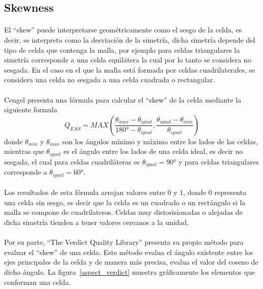 \documentclass[letterpaper, openright, 12pt]{book}
\begin{document}
    \subsection{Skewness}
    \paragraph*{}
    El ``skew'' puede interpretarse geométricamente como el sesgo de la celda,
    es decir, se interpreta como la desviación de la simetría, dicha simetría
    depende del tipo de celda que contenga la malla, por ejemplo para celdas
    triangulares la simetría corresponde a una celda equilátera la cual por lo
    tanto se considera no sesgada. En el caso en el que la malla está formada
    por celdas cuadrilaterales, se considera una celda no sesgada a una celda
    cuadrada o rectangular.

    \paragraph*{}
    Cengel \cite{cengel} presenta una fórmula para calcular el ``skew'' de la
    celda mediante la siguiente formula
    \begin{equation}
      Q_{EAS} = MAX \left(
      \frac{\theta_{max} - \theta_{igual}}{180\si{\degree} - \theta_{igual}},
      \frac{\theta_{igual} - \theta_{min}}{\theta_{igual}}
      \right)
    \end{equation}
    donde $\theta_{min}$ y $\theta_{max}$ son los ángulos mínimo y máximo entre
    los lados de las celdas, mientras que $\theta_{igual}$ es el ángulo entre
    los lados de una celda ideal, es decir no sesgada, el cual para celdas
    cuadriláteras es $\theta_{igual} = 90\si{\degree}$ y para celdas
    triangulares corresponde a $\theta_{igual} = 60\si{\degree}$.

    \paragraph*{}
    Los resultados de esta fórmula arrojan valores entre $0$ y $1$, donde $0$
    representa una celda sin sesgo, es decir que la celda es un cuadrado o un
    rectángulo si la malla se compone de cuadrilateros. Celdas muy
    distorisionadas o alejadas de dicha simetría tienden a tener valores
    cercanos a la unidad.

    \paragraph*{}
    Por su parte, ``The Verdict Quality Library'' presenta su propio método para
    evaluar el ``skew'' de una celda. Este método evalua el ángulo existente
    entre los ejes principales de la celda y de manera más precisa, evalua el
    valor del coseno de dicho ángulo. La figura~\ref{aspect_verdict} muestra
    gráficamente los elementos que conforman una celda.
\end{document}
